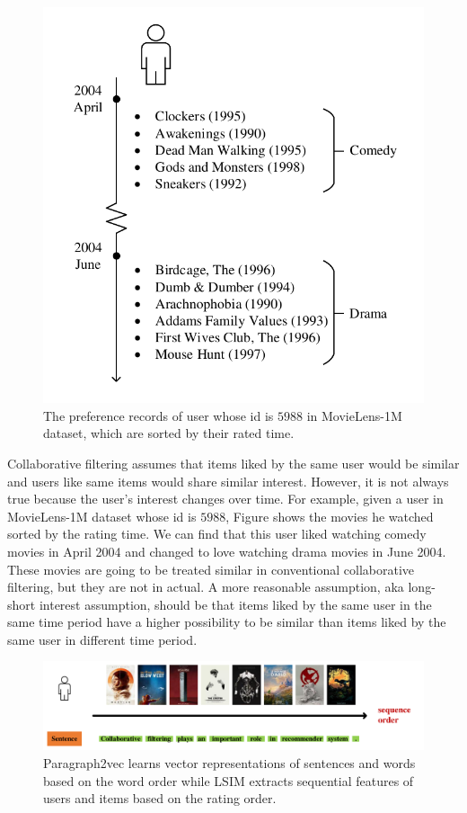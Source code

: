 \documentclass{llncs}
\begin{document}
\begin{figure}[htbp]
	\centering
	\includegraphics[scale=0.7]{images/example.pdf}
	\caption{The preference records of user whose id is $5988$ in MovieLens-1M dataset,
		which are sorted by their rated time.}
	\label{fig:example}
\end{figure}

Collaborative filtering assumes that items liked by the same user would be similar and
users like same items would share similar interest.
However, it is not always true because the user's interest changes over time.
For example, given a user in MovieLens-1M dataset whose id is $5988$,
Figure \label{fig:example} shows the movies he watched sorted by the rating time.
We can find that this user liked watching comedy movies in April 2004 and
changed to love watching drama movies in June 2004.
These movies are going to be treated similar in conventional collaborative filtering,
but they are not in actual.
A more reasonable assumption, aka long-short interest assumption, should be that
items liked by the same user in the same time period have a higher possibility
to be similar than items liked by the same user in different time period.

\begin{figure}[htbp]
	\centering
	\includegraphics[scale=0.3]{images/example2.pdf}
	\caption{Paragraph2vec learns vector representations of sentences and words
		based on the word order
		while LSIM extracts sequential features of users and items
		based on the rating order.
	}
	\label{fig:example2}
\end{figure}
\end{document}
